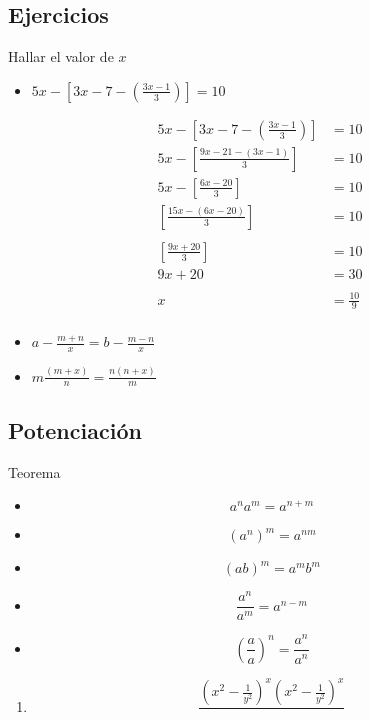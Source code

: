 \documentclass[16pt,]{krantz}
\providecommand{\tightlist}{%
  \setlength{\itemsep}{0pt}\setlength{\parskip}{0pt}}
\theoremstyle{definition}
\theoremstyle{definition}
\theoremstyle{definition}
\theoremstyle{definition}
\theoremstyle{remark}
\begin{document}
\hypertarget{ejercicios-2}{%
\subsection{Ejercicios}\label{ejercicios-2}}

Hallar el valor de \(x\)

\begin{itemize}
\tightlist
\item
  \(5x-[3x-7-(\frac{3x-1}{3})]=10\)
\end{itemize}

\[\begin{aligned}
5x-[3x-7-(\frac{3x-1}{3})]&=10\\
5x-[\frac{9x-21-(3x-1)}{3}]&=10\\5x-[\frac{6x-20}{3}]&=10\\
[\frac{15x-(6x-20)}{3}]&=10\\
\\
    [\frac{9x+20}{3}]&=10\\ {9x+20}&=30\\
    \\  x&=\frac{10}{9}\\
\end{aligned}
\]

\begin{itemize}
\tightlist
\item
  \(a-\frac{m+n}{x}=b-\frac{m-n}{x}\)
\item
  \(m\frac{(m+x)}{n}=\frac{n(n+x)}{m}\)
\end{itemize}

\hypertarget{potenciaciuxf3n}{%
\subsection{Potenciación}\label{potenciaciuxf3n}}

Teorema

\begin{itemize}
\tightlist
\item
  \[a^na^m=a^{n+m}\]
\item
  \[(a^n)^m=a^{nm}\]
\item
  \[(ab)^m=a^mb^m\]
\item
  \[\frac{a^n}{a^m}=a^{n-m}\]
\item
  \[(\frac{a}{a})^n=\frac{a^n}{a^n}\]
\end{itemize}

\begin{enumerate}
\def\labelenumi{\arabic{enumi}.}
\tightlist
\item
  \[\frac{(x^2-\frac{1}{y^2})^x(x^2-\frac{1}{y^2})^x}{}\]
\end{enumerate}
\end{document}

